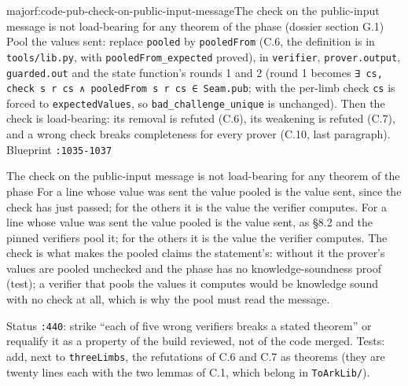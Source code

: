 \begin{finding}{major}{f:code-pub-check-on-public-input-message}{The check on the public-input message is not load-bearing for any theorem of the phase (dossier section G.1)}
Pool the values sent: replace \texttt{pooled} by \texttt{pooledFrom} (C.6, the definition is in \texttt{tools/\allowbreak{}lib.\allowbreak{}py}, with \texttt{pooledFrom\_\allowbreak{}expected} proved), in \texttt{verifier}, \texttt{prover.\allowbreak{}output}, \texttt{guarded.\allowbreak{}out} and the state function's rounds 1 and 2 (round 1 becomes \texttt{∃\allowbreak{} c\allowbreak{}s\allowbreak{},\allowbreak{} c\allowbreak{}h\allowbreak{}e\allowbreak{}c\allowbreak{}k\allowbreak{} s\allowbreak{} r\allowbreak{} c\allowbreak{}s\allowbreak{} ∧\allowbreak{} p\allowbreak{}o\allowbreak{}o\allowbreak{}l\allowbreak{}e\allowbreak{}d\allowbreak{}F\allowbreak{}r\allowbreak{}o\allowbreak{}m\allowbreak{} s\allowbreak{} r\allowbreak{} c\allowbreak{}s\allowbreak{} ∈\allowbreak{} S\allowbreak{}e\allowbreak{}a\allowbreak{}m\allowbreak{}.\allowbreak{}p\allowbreak{}u\allowbreak{}b}; with the per-limb check \texttt{cs} is forced to \texttt{expectedValues}, so \texttt{bad\_\allowbreak{}challenge\_\allowbreak{}unique} is unchanged). Then the check is load-bearing: its removal is refuted (C.6), its weakening is refuted (C.7), and a wrong check breaks completeness for every prover (C.10, last paragraph). Blueprint \texttt{:1035-{}1037}

\begin{change}{The check on the public-input message is not load-bearing for any theorem of the phase}
\asis For a line whose value was sent the value pooled is the value sent, since the check has just passed; for the others it is the value the verifier computes.
\asproposed For a line whose value was sent the value pooled is the value sent, as §8.2 and the pinned verifiers pool it; for the others it is the value the verifier computes. The check is what makes the pooled claims the statement's: without it the prover's values are pooled unchecked and the phase has no knowledge-soundness proof (test); a verifier that pools the values it computes would be knowledge sound with no check at all, which is why the pool must read the message.
\end{change}
Status \texttt{:440}: strike \enquote{each of five wrong verifiers breaks a stated theorem} or requalify it as a property of the build reviewed, not of the code merged. Tests: add, next to \texttt{threeLimbs}, the refutations of C.6 and C.7 as theorems (they are twenty lines each with the two lemmas of C.1, which belong in \texttt{ToArkLib/}).


\end{finding}

